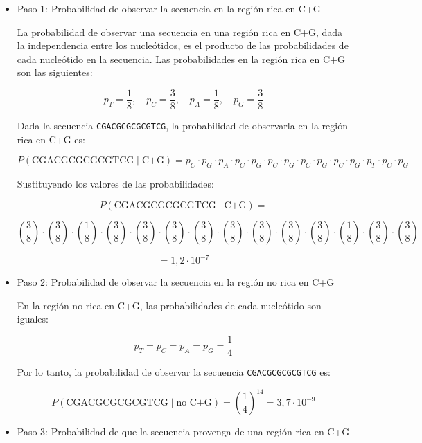 \begin{itemize}
\item Paso 1: Probabilidad de observar la secuencia en la región rica en C+G

La probabilidad de observar una secuencia en una región rica en C+G, dada la independencia entre los nucleótidos, es el producto de las probabilidades de cada nucleótido en la secuencia. Las probabilidades en la región rica en C+G son las siguientes:

\[
p_T = \frac{1}{8}, \quad p_C = \frac{3}{8}, \quad p_A = \frac{1}{8}, \quad p_G = \frac{3}{8}
\]

Dada la secuencia \texttt{CGACGCGCGCGTCG}, la probabilidad de observarla en la región rica en C+G es:

\[
P(\text{CGACGCGCGCGTCG} \mid \text{C+G}) = p_C \cdot p_G \cdot p_A \cdot p_C \cdot p_G \cdot p_C \cdot p_G \cdot p_C \cdot p_G \cdot p_C \cdot p_G \cdot p_T \cdot p_C \cdot p_G
\]

Sustituyendo los valores de las probabilidades:

\small
\[
P(\text{CGACGCGCGCGTCG} \mid \text{C+G}) = 
\]

\[
\left( \frac{3}{8} \right) \cdot \left( \frac{3}{8} \right) \cdot \left( \frac{1}{8} \right) \cdot \left( \frac{3}{8} \right) \cdot \left( \frac{3}{8} \right) \cdot \left( \frac{3}{8} \right) \cdot \left( \frac{3}{8} \right) \cdot \left( \frac{3}{8} \right) \cdot \left( \frac{3}{8} \right) \cdot \left( \frac{3}{8} \right) \cdot \left( \frac{3}{8} \right) \cdot \left( \frac{1}{8} \right) \cdot \left( \frac{3}{8} \right) \cdot \left( \frac{3}{8} \right)
\]

\[
= 1,2 \cdot 10^{-7}
\]

\normalsize

\item Paso 2: Probabilidad de observar la secuencia en la región no rica en C+G

En la región no rica en C+G, las probabilidades de cada nucleótido son iguales:

\[
p_T = p_C = p_A = p_G = \frac{1}{4}
\]

Por lo tanto, la probabilidad de observar la secuencia \texttt{CGACGCGCGCGTCG} es:

\[
P(\text{CGACGCGCGCGTCG} \mid \text{no C+G}) = \left( \frac{1}{4} \right)^{14} = 3,7 \cdot 10^{-9}
\]

\item Paso 3: Probabilidad de que la secuencia provenga de una región rica en C+G


\end{itemize}
